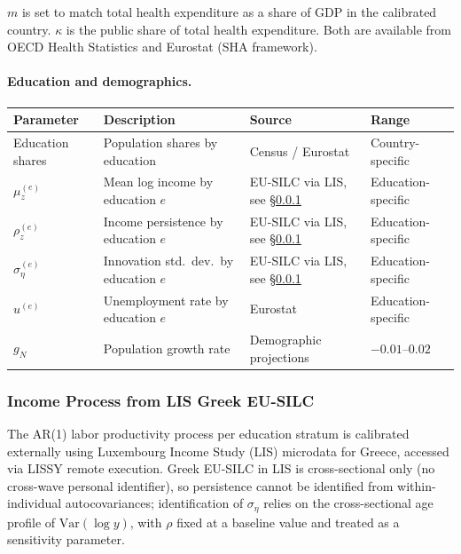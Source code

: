 \noindent $m$ is set to match total health expenditure as a share of GDP in the calibrated country. $\kappa$ is the public share of total health expenditure. Both are available from OECD Health Statistics and Eurostat (SHA framework).

\paragraph{Education and demographics.}

\begin{table}[H]
\centering
\small
\begin{tabular}{llll}
\toprule
Parameter & Description & Source & Range \\
\midrule
Education shares & Population shares by education & Census / Eurostat & Country-specific \\
$\mu_z^{(e)}$ & Mean log income by education $e$ & EU-SILC via LIS, see \S\ref{sec:lis-income} & Education-specific \\
$\rho_z^{(e)}$ & Income persistence by education $e$ & EU-SILC via LIS, see \S\ref{sec:lis-income} & Education-specific \\
$\sigma_\eta^{(e)}$ & Innovation std.\ dev.\ by education $e$ & EU-SILC via LIS, see \S\ref{sec:lis-income} & Education-specific \\
$u^{(e)}$ & Unemployment rate by education $e$ & Eurostat & Education-specific \\
$g_N$ & Population growth rate & Demographic projections & $-0.01$--$0.02$ \\
\bottomrule
\end{tabular}
\end{table}

\subsubsection{Income Process from LIS Greek EU-SILC}\label{sec:lis-income}

The AR(1) labor productivity process per education stratum is calibrated externally using Luxembourg Income Study (LIS) microdata for Greece, accessed via LISSY remote execution. Greek EU-SILC in LIS is cross-sectional only (no cross-wave personal identifier), so persistence cannot be identified from within-individual autocovariances; identification of $\sigma_\eta$ relies on the cross-sectional age profile of $\mathrm{Var}(\log y)$, with $\rho$ fixed at a baseline value and treated as a sensitivity parameter.


